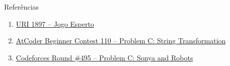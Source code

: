 \begin{frame}[fragile]{Referências}

    \begin{enumerate}
        \item \href{https://www.urionlinejudge.com.br/judge/pt/problems/view/1897}{URI 1897 -- Jogo Esperto}

        \item \href{https://atcoder.jp/contests/abc110/tasks/abc110_c}{AtCoder Beginner Contest 110 -- Problem C: String Transformation}

        \item \href{https://codeforces.com/problemset/problem/1004/C}{Codeforces Round \#495 -- Problem C: Sonya and Robots}

    \end{enumerate}

\end{frame}
